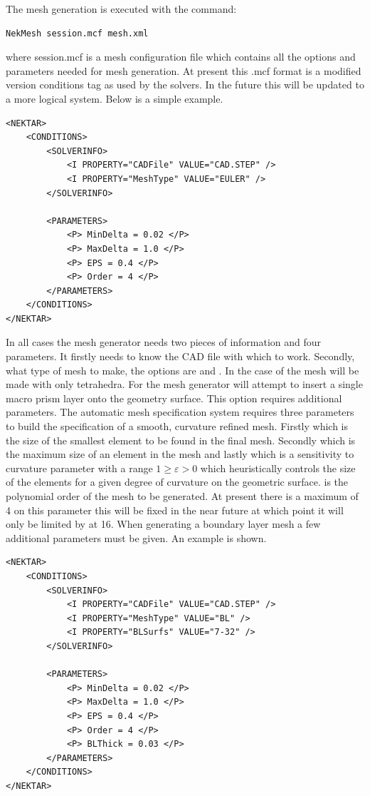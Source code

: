The mesh generation is executed with the command:
\begin{lstlisting}[style=BashInputStyle]
    NekMesh session.mcf mesh.xml
\end{lstlisting}
where session.mcf is a mesh configuration file which contains all the options
and parameters needed for mesh generation. At present this .mcf format is a
modified version conditions tag as used by the solvers. In the future this will
be updated to a more logical system. Below is a simple
example.
\begin{lstlisting}[style=XmlStyle]
<NEKTAR>
    <CONDITIONS>
        <SOLVERINFO>
            <I PROPERTY="CADFile" VALUE="CAD.STEP" />
            <I PROPERTY="MeshType" VALUE="EULER" />
        </SOLVERINFO>

        <PARAMETERS>
            <P> MinDelta = 0.02 </P>
            <P> MaxDelta = 1.0 </P>
            <P> EPS = 0.4 </P>
            <P> Order = 4 </P>
        </PARAMETERS>
    </CONDITIONS>
</NEKTAR>
\end{lstlisting}
In all cases the mesh generator needs two pieces of information and four
parameters. It firstly needs to know the CAD file with which to work. Secondly,
what type of mesh to make, the options are  and . In the
case of  the mesh will be made with only tetrahedra. For 
the mesh generator will attempt to insert a single macro prism layer onto the
geometry surface. This option requires additional parameters. The automatic
mesh specification system requires three parameters to build the specification
of a smooth, curvature refined mesh. Firstly  which is the size
of the smallest element to be found in the final mesh. Secondly 
which is the maximum size of an element in the mesh and lastly  which
is a sensitivity to curvature parameter with a range $1 \geq \varepsilon > 0$
which heuristically controls the size of the elements for a given degree of
curvature on the geometric surface.  is the polynomial order of
the mesh to be generated. At present there is a maximum of 4 on this parameter
this will be fixed in the near future at which point it will only be limited
by \nekpp at 16.
%
When generating a boundary layer mesh a few additional parameters must be given.
An example is shown.
\begin{lstlisting}[style=XmlStyle]
<NEKTAR>
    <CONDITIONS>
        <SOLVERINFO>
            <I PROPERTY="CADFile" VALUE="CAD.STEP" />
            <I PROPERTY="MeshType" VALUE="BL" />
	        <I PROPERTY="BLSurfs" VALUE="7-32" />
        </SOLVERINFO>

        <PARAMETERS>
            <P> MinDelta = 0.02 </P>
            <P> MaxDelta = 1.0 </P>
            <P> EPS = 0.4 </P>
            <P> Order = 4 </P>
            <P> BLThick = 0.03 </P>
        </PARAMETERS>
    </CONDITIONS>
</NEKTAR>
\end{lstlisting}
